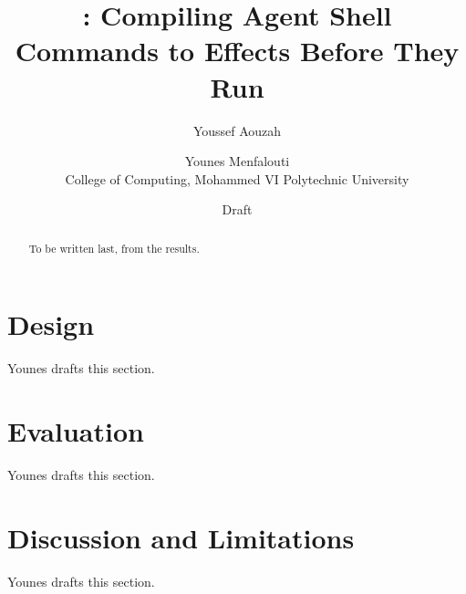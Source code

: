 \documentclass[11pt]{article}
\title{\sys: Compiling Agent Shell Commands to Effects Before They Run}
\author{Youssef Aouzah \and Younes Menfalouti\\[2pt]
  \small College of Computing, Mohammed VI Polytechnic University}
\date{Draft}
\begin{document}
\maketitle

\begin{abstract}
To be written last, from the results.
\end{abstract}




\section{Design}\label{sec:design}
Younes drafts this section.

\section{Evaluation}\label{sec:evaluation}
Younes drafts this section.

\section{Discussion and Limitations}\label{sec:discussion}
Younes drafts this section.



\end{document}
